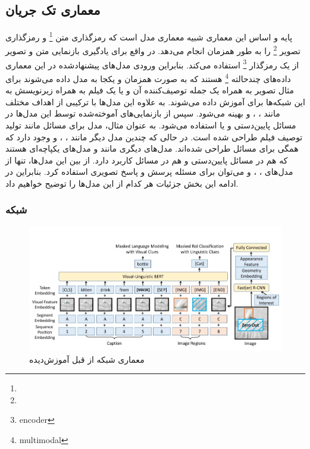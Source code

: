 \subsection[معماری تک جریان]{معماری تک جریان}
	پایه و اساس این معماری شبیه معماری مدل 
	\cite{devlin2018bert}
	است که رمزگذاری متن
	\footnote{}
	و رمزگذاری تصویر 
	\footnote{}
	را به طور همزمان انجام می‌دهد. در واقع برای یادگیری بازنمایی متن و تصویر از یک  رمزگذار
	\footnote{encoder}
	استفاده می‌کند. بنابراین ورودی مدل‌های پیشنهادشده در این معماری داده‌های چندحالته
	\footnote{multimodal}
	هستند که به صورت همزمان و یکجا به مدل داده می‌شوند برای مثال تصویر به همراه یک جمله توصیف‌کننده آن و یا یک فیلم به همراه زیرنویسش به این شبکه‌ها برای آموزش داده می‌شوند. به علاوه این مدل‌ها با ترکیبی از اهداف مختلف مانند 
	،
	،
	و 
   بهینه می‌شود. سپس از بازنمایی‌های آموخته‌شده توسط این مدل‌ها در مسائل پایین‌دستی 
   و یا 
   استفاده می‌شود. به عنوان مثال، مدل
	\cite{sun2019videobert}
	برای مسائل 
	مانند تولید توصیف فیلم طراحی شده است. در حالی که چندین مدل دیگر مانند
	\cite{alberti2019fusion}
	،
	 \cite{li2020unicoder}
	،
	\cite{su2019vl}
	و
	\cite{chen2020uniter}
	وجود دارد که همگی برای مسائل 
    طراحی شده‌اند. مدل‌های دیگری مانند
	\cite{zhou2020unified}
	و
	 \cite{li2020oscar}
	مدل‌های یکپاچه‌ای هستند که هم در مسائل پایین‌دستی 
	و هم در مسائل
	کاربرد دارد. از بین این مدل‌ها، تنها از مدل‌های
	،
	،
	و
	می‌توان برای مسئله پرسش و پاسخ تصویری استفاده کرد. بنابراین در ادامه این بخش جزئیات هر کدام از این مدل‌ها را توضیح خواهیم داد.
	
\subsubsection{شبکه }
	\begin{figure}
		\centerline{\includegraphics[scale=0.5]{images/VLBERT.JPG}}
		\caption[معماری شبکه از قبل آموزش‌دیده ]{معماری شبکه از قبل آموزش‌دیده\cite{su2019vl}}
		\label{fig:VLBERT}
	\end{figure}


